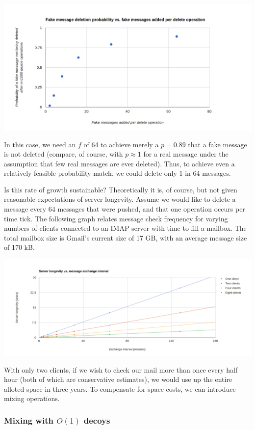 \documentclass[pageno]{jpaper}
\begin{document}
\includegraphics[width=\textwidth]{fake-message-deletion-probability-vs-num-fake-messages-added}

In this case, we need an $f$ of 64 to achieve merely a $p=0.89$ that a fake message is not deleted (compare, of course, with $p \approx 1$ for a real message under the assumption that few real messages are ever deleted). Thus, to achieve even a relatively feasible probability match, we could delete only 1 in 64 messages.

Is this rate of growth sustainable? Theoretically it is, of course, but not given reasonable expectations of server longevity. Assume we would like to delete a message every 64 messages that were pushed, and that one operation occurs per time tick. The following graph relates message check frequency for varying numbers of clients connected to an IMAP server with time to fill a mailbox. The total mailbox size is Gmail's current size of 17 GB, with an average message size of 170 kB.

\includegraphics[width=\textwidth]{server_longevity}

With only two clients, if we wish to check our mail more than once every half hour (both of which are conservative estimates), we would use up the entire alloted space in three years. To compensate for space costs, we can introduce mixing operations.

\subsubsection{Mixing with \texorpdfstring{$O(1)$}{O(1)} decoys}
\end{document}
